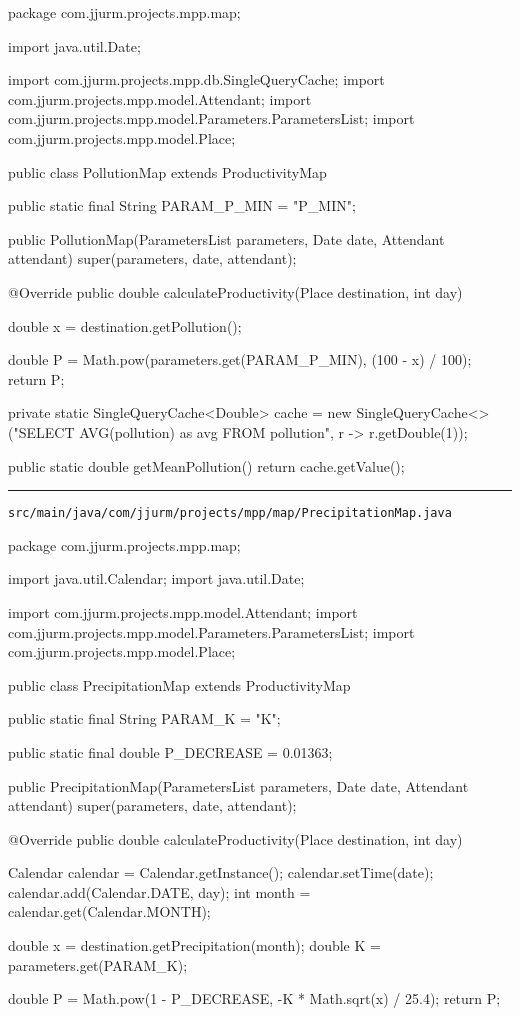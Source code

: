 \begin{javacode}
package com.jjurm.projects.mpp.map;

import java.util.Date;

import com.jjurm.projects.mpp.db.SingleQueryCache;
import com.jjurm.projects.mpp.model.Attendant;
import com.jjurm.projects.mpp.model.Parameters.ParametersList;
import com.jjurm.projects.mpp.model.Place;

public class PollutionMap extends ProductivityMap {

  public static final String PARAM_P_MIN = "P_MIN";

  public PollutionMap(ParametersList parameters, Date date, Attendant attendant) {
    super(parameters, date, attendant);
  }

  @Override
  public double calculateProductivity(Place destination, int day) {
    double x = destination.getPollution();

    double P = Math.pow(parameters.get(PARAM_P_MIN), (100 - x) / 100);
    return P;
  }

  private static SingleQueryCache<Double> cache =
      new SingleQueryCache<>("SELECT AVG(pollution) as avg FROM pollution", r -> r.getDouble(1));

  public static double getMeanPollution() {
    return cache.getValue();
  }

}
\end{javacode}

\noindent\rule{\textwidth}{0.4pt}

\nointerlineskip
\texttt{src/main/java/com/jjurm/projects/mpp/map/PrecipitationMap.java}

\begin{javacode}
package com.jjurm.projects.mpp.map;

import java.util.Calendar;
import java.util.Date;

import com.jjurm.projects.mpp.model.Attendant;
import com.jjurm.projects.mpp.model.Parameters.ParametersList;
import com.jjurm.projects.mpp.model.Place;

public class PrecipitationMap extends ProductivityMap {

  public static final String PARAM_K = "K";

  public static final double P_DECREASE = 0.01363;

  public PrecipitationMap(ParametersList parameters, Date date, Attendant attendant) {
    super(parameters, date, attendant);
  }

  @Override
  public double calculateProductivity(Place destination, int day) {
    Calendar calendar = Calendar.getInstance();
    calendar.setTime(date);
    calendar.add(Calendar.DATE, day);
    int month = calendar.get(Calendar.MONTH);

    double x = destination.getPrecipitation(month);
    double K = parameters.get(PARAM_K);

    double P = Math.pow(1 - P_DECREASE, -K * Math.sqrt(x) / 25.4);
    return P;
  }

}
\end{javacode}

